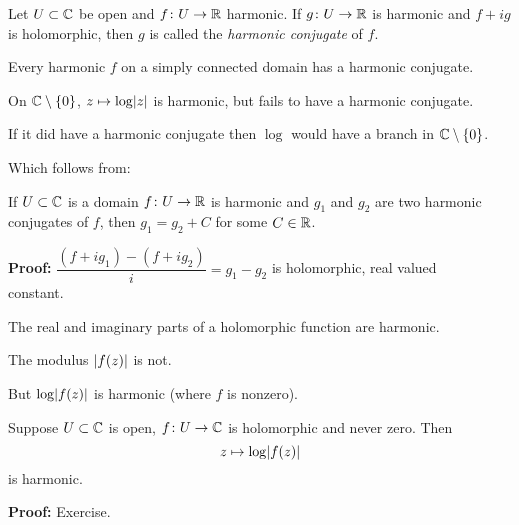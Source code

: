 \documentclass[10pt,aspectratio=169]{beamer}
\begin{document}
\begin{frame}
\begin{definition}
Let $U \subset {\mathbb{C}}$ be open and $f \colon U \to {\mathbb{R}}$ harmonic.
If $g \colon U \to {\mathbb{R}}$ is harmonic and $f + i g$ is holomorphic,
then $g$ is called the \emph{harmonic conjugate} of $f$.
\end{definition}

\pause

Every harmonic $f$ on a simply connected domain has a harmonic conjugate.

\medskip
\pause

On ${\mathbb{C}} \setminus \{ 0 \}$,
$z \mapsto \log \lvert {z} \rvert$ is harmonic, but
fails to have a harmonic conjugate.

\medskip
\pause

If it did have a harmonic conjugate
then $\log$ would have a branch in ${\mathbb{C}} \setminus \{0\}$.

\pause
Which follows from:

\begin{proposition}
If $U \subset {\mathbb{C}}$ is a domain $f \colon U \to {\mathbb{R}}$ is harmonic
and $g_1$ and $g_2$ are two harmonic conjugates of $f$,
then $g_1 = g_2 + C$ for some $C \in {\mathbb{R}}$.
\end{proposition}

\pause
\textbf{Proof:}
$\dfrac{(f + i g_1) - (f + i g_2)}{i} =  g_1-g_2$
is holomorphic, real valued ~\thus~ constant.

\end{frame}

\begin{frame}
The real and imaginary parts of a holomorphic function are harmonic.

\pause
\medskip

The modulus $\lvert {f(z)} \rvert$ is not.

\pause
\medskip

But $\log \lvert {f(z)} \rvert$ is harmonic (where $f$ is nonzero).

\pause

\begin{proposition}
Suppose $U \subset {\mathbb{C}}$ is open, $f \colon U \to {\mathbb{C}}$ is holomorphic
and never zero.  Then
\begin{equation*}
z \mapsto \log \lvert {f(z)} \rvert
\end{equation*}
is harmonic.
\end{proposition}

\textbf{Proof:} Exercise.
\end{frame}
\end{document}
